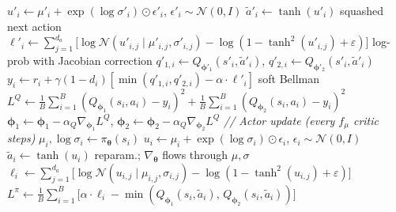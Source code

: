 \documentclass[11pt]{article}
\begin{document}
\begin{algorithm}[p]
\begin{minipage}[t]{0.68\linewidth}
\begin{algorithmic}[1]
        \State \hspace{\algorithmicindent} $u'_i \gets \mu'_i + \exp(\log\sigma'_i) \odot \epsilon'_i$, \;\; $\epsilon'_i \sim \mathcal{N}(0, I)$
        \State \hspace{\algorithmicindent} $\tilde{a}'_i \gets \tanh(u'_i)$ \hfill squashed next action
        \State \hspace{\algorithmicindent} $\ell'_i \!\gets\! \sum_{j=1}^{d_a}\!\big[\log\mathcal{N}(u'_{i,j} \!\mid\! \mu'_{i,j}, \sigma'_{i,j}) - \log(1 {-} \tanh^2\!(u'_{i,j}) {+} \varepsilon)\big]$
        \Statex \hspace{\algorithmicindent}\hspace{\algorithmicindent}\hspace{\algorithmicindent}\hspace{\algorithmicindent}\hfill log-prob with Jacobian correction
        \State \hspace{\algorithmicindent} $q'_{1,i} \gets Q_{\boldsymbol{\phi}'_1}(s'_i, \tilde{a}'_i)$, \;\; $q'_{2,i} \gets Q_{\boldsymbol{\phi}'_2}(s'_i, \tilde{a}'_i)$
        \State \hspace{\algorithmicindent} $y_i \gets r_i + \gamma(1 {-} d_i)[\min(q'_{1,i}, q'_{2,i}) - \alpha \cdot \ell'_i]$ \hfill soft Bellman
        \State $L^Q \!\gets\! \frac{1}{B}\!\sum_{i=1}^B\!(Q_{\boldsymbol{\phi}_1}(s_i, a_i) {-} y_i)^2 + \frac{1}{B}\!\sum_{i=1}^B\!(Q_{\boldsymbol{\phi}_2}(s_i, a_i) {-} y_i)^2$
        \State $\boldsymbol{\phi}_1 \gets \boldsymbol{\phi}_1 - \alpha_Q \nabla_{\boldsymbol{\phi}_1} L^Q$, \;\; $\boldsymbol{\phi}_2 \gets \boldsymbol{\phi}_2 - \alpha_Q \nabla_{\boldsymbol{\phi}_2} L^Q$
        \Statex \hspace{\algorithmicindent}\hspace{\algorithmicindent}\hspace{\algorithmicindent}\textit{// Actor update (every $f_\mu$ critic steps)}
            \State $\mu_i, \log\sigma_i \gets \pi_{\boldsymbol{\theta}}(s_i)$
            \State $u_i \gets \mu_i + \exp(\log\sigma_i) \odot \epsilon_i$, \;\; $\epsilon_i \sim \mathcal{N}(0, I)$
            \State $\tilde{a}_i \gets \tanh(u_i)$ \hfill reparam.; $\nabla_{\boldsymbol{\theta}}$ flows through $\mu, \sigma$
            \State $\ell_i \gets \sum_{j=1}^{d_a}\big[\log\mathcal{N}(u_{i,j} \mid \mu_{i,j}, \sigma_{i,j}) - \log(1 {-} \tanh^2\!(u_{i,j}) {+} \varepsilon)\big]$
            \State $L^\pi \!\gets\! \frac{1}{B}\!\sum_{i=1}^B\!\big[\alpha \cdot \ell_i - \min(Q_{\boldsymbol{\phi}_1}(s_i, \tilde{a}_i),\, Q_{\boldsymbol{\phi}_2}(s_i, \tilde{a}_i))\big]$

\end{algorithmic}
\end{minipage}
\end{algorithm}
\end{document}
